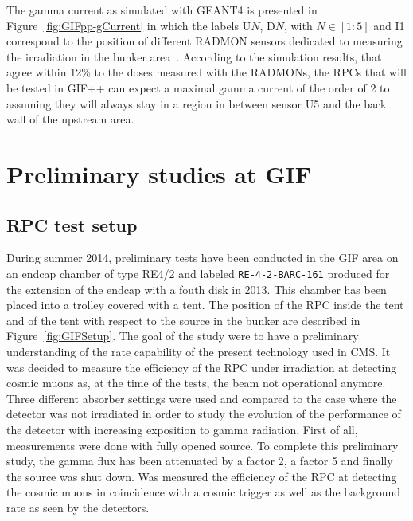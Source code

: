 	The gamma current as simulated with GEANT4 is presented in Figure~\ref{fig:GIFpp-gCurrent} in which the labels U$N$, D$N$, with $N \in [1:5]$ and I1 correspond to the position of different \acf{RADMON} sensors dedicated to measuring the irradiation in the bunker area~\cite{PFEIFFER2017}. According to the simulation results, that agree within 12\% to the doses measured with the RADMONs, the RPCs that will be tested in GIF++ can expect a maximal gamma current of the order of 2 to  \siflux assuming they will always stay in a region in between sensor U5 and the back wall of the upstream area.
	 
\section{Preliminary studies at GIF}
\label{chapt5:sec:GIFtests}

	\subsection{RPC test setup}
	\label{chapt5:ssec:RPCSetup}
	
	During summer 2014, preliminary tests have been conducted in the GIF area on an endcap chamber of type RE4/2 and labeled \texttt{RE-4-2-BARC-161} produced for the extension of the endcap with a fouth disk in 2013. This chamber has been placed into a trolley covered with a tent. The position of the RPC inside the tent and of the tent with respect to the source in the bunker are described in Figure~\ref{fig:GIFSetup}. The goal of the study were to have a preliminary understanding of the rate capability of the present technology used in CMS. It was decided to measure the efficiency of the RPC under irradiation at detecting cosmic muons as, at the time of the tests, the beam not operational anymore. Three different absorber settings were used and compared to the case where the detector was not irradiated in order to study the evolution of the performance of the detector with increasing exposition to gamma radiation. First of all, measurements were done with fully opened source. To complete this preliminary study, the gamma flux has been attenuated by a factor 2, a factor 5 and finally the source was shut down. Was measured the efficiency of the RPC at detecting the cosmic muons in coincidence with a cosmic trigger as well as the background rate as seen by the detectors.

